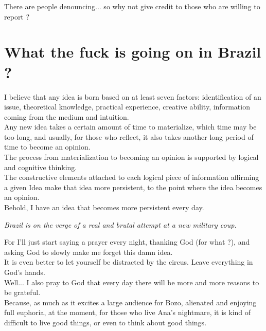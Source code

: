 \documentclass[11pt]{book}
\begin{document}
\noindent There are people denouncing... so why not give credit to those who are willing to report ? \\

\chapter{What the fuck is going on in Brazil ?}

\noindent I believe that any idea is born based on at least seven factors: identification of an issue, theoretical knowledge, practical experience, creative ability, information coming from the medium and intuition. \\

\noindent Any new idea takes a certain amount of time to materialize, which time may be too long, and usually, for those who reflect, it also takes another long period of time to become an opinion. \\

\noindent The process from materialization to becoming an opinion is supported by logical and cognitive thinking. \\

\noindent The constructive elements attached to each logical piece of information affirming a given Idea make that idea more persistent, to the point where the idea becomes an opinion. \\

\noindent Behold, I have an idea that becomes more persistent every day.

\noindent \begin{center} \emph{Brazil is on the verge of a real and brutal attempt at a new military coup.} \end{center}

\noindent For I'll just start saying a prayer every night, thanking God (for what ?), and asking God to slowly make me forget this damn idea. \\

\noindent It is even better to let yourself be distracted by the circus. Leave everything in God's hands. \\

\noindent Well... I also pray to God that every day there will be more and more reasons to be grateful.  \\ 

\noindent Because, as much as it excites a large audience for Bozo, alienated and enjoying full euphoria, at the moment, for those who live Ana's nightmare, it is kind of difficult to live good things, or even to think about good things. \\
\end{document}
